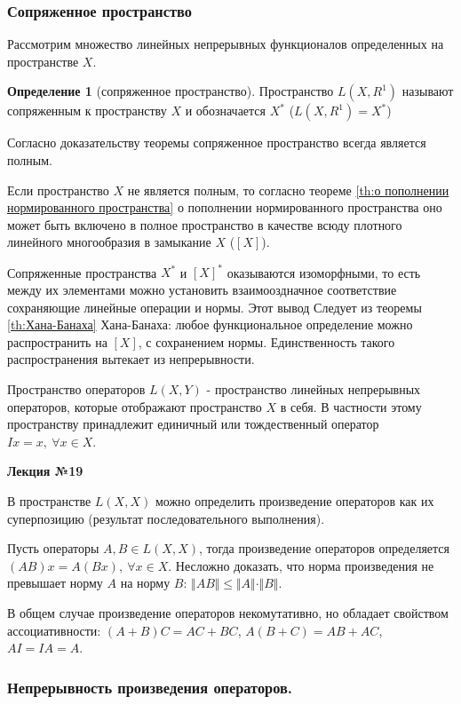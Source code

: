 \documentclass[14pt,a4paper]{extarticle}
\theoremstyle{definition}
\newtheorem{definition}{Определение}[section]
\theoremstyle{remark}
\renewcommand{\[}{\begin{dmath*}[compact]}
\renewcommand{\]}{\end{dmath*}}
\newcommand{\sep}{ , \ \allowbreak }
\begin{document}
\subsubsection{Сопряженное пространство}

Рассмотрим множество линейных непрерывных функционалов определенных на
пространстве $X$.

\begin{definition}[сопряженное пространство]
  Пространство $L(X,R^1)$ называют сопряженным к пространству $X$ и
  обозначается $X^*$ ($L(X,R^1)=X^*$)
\end{definition}

Согласно доказательству теоремы сопряженное пространство всегда является полным.

Если пространство $X$ не является полным, то согласно теореме
\ref{th:о пополнении нормированного пространства}
о пополнении нормированного пространства оно может быть включено в полное
пространство в качестве всюду плотного линейного многообразия в замыкание $X$
($[X]$).

Сопряженные пространства $X^*$ и $[X]^*$ оказываются изоморфными, то есть между
их элементами можно установить взаимооздначное соответствие сохраняющие
линейные операции и нормы. Этот вывод Следует из теоремы \ref{th:Хана-Банаха}
Хана-Банаха: любое функциональное определение можно распространить на $[X]$,
с сохранением нормы.
Единственность такого распространения вытекает из непрерывности.

Пространство операторов $L(X,Y)$ - пространство линейных непрерывных
операторов, которые отображают пространство $X$ в себя. В частности этому
пространству принадлежит единичный или тождественный оператор
$Ix=x \sep \forall x \in X$.

\textbf{Лекция №19}

В пространстве $L(X,X)$ можно определить произведение операторов как их
суперпозицию (результат последовательного выполнения).

Пусть операторы $A,B \in L(X,X)$, тогда произведение операторов определяется
$(AB)x = A(Bx) \sep \forall x \in X$.
Несложно доказать, что норма произведения не превышает норму $A$ на норму $B$:
$\Vert AB \Vert \leq \Vert A \Vert \cdot \Vert B \Vert$.

В общем случае произведение операторов некомутативно,
но обладает свойством ассоциативности: $(A+B)C = AC+BC$, $A(B+C) = AB+AC$,
$AI = IA = A$.

\subsubsection{Непрерывность произведения операторов.}
\end{document}
